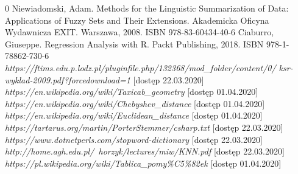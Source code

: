 \documentclass{classrep}
\begin{document}
\begin{thebibliography} {0}
 Niewiadomski, Adam. Methods for the Linguistic Summarization of Data: Applications of Fuzzy Sets and Their Extensions. Akademicka Oficyna Wydawnicza EXIT. Warszawa, 2008. ISBN 978-83-60434-40-6
 Ciaburro, Giuseppe. Regression Analysis with R. Packt Publishing, 2018. ISBN 978-1-78862-730-6
 \textsl{https://ftims.edu.p.lodz.pl/pluginfile.php/132368/mod\_folder/content/0/
ksr-wyklad-2009.pdf?forcedownload=1} [dostęp 22.03.2020]
 \textsl{https://en.wikipedia.org/wiki/Taxicab\_geometry} [dostęp 01.04.2020]
 \textsl{https://en.wikipedia.org/wiki/Chebyshev\_distance} [dostęp 01.04.2020]
 \textsl{https://en.wikipedia.org/wiki/Euclidean\_distance} [dostęp 01.04.2020]
 \textsl{https://tartarus.org/martin/PorterStemmer/csharp.txt} [dostęp 22.03.2020]
 \textsl{https://www.dotnetperls.com/stopword-dictionary} [dostęp 22.03.2020]
 \textsl{http://home.agh.edu.pl/~horzyk/lectures/miw/KNN.pdf} [dostęp 22.03.2020]
 \textsl{https://pl.wikipedia.org/wiki/Tablica\_pomy\%C5\%82ek} [dostęp 01.04.2020]

\end{thebibliography}
\end{document}
